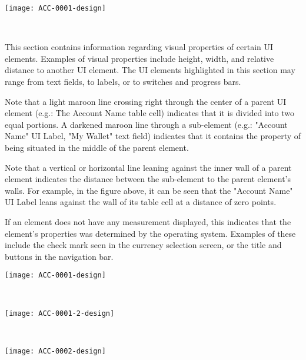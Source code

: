 
\centerline{\texttt{[image: ACC-0001-design]}}

~ \newline

This section contains information regarding visual properties of certain UI elements. Examples of visual properties include height, width, and relative distance to another UI element. The UI elements highlighted in this section may range from text fields, to labels, or to switches and progress bars. \newline

Note that a light maroon line crossing right through the center of a parent UI element (e.g.: The Account Name table cell) indicates that it is divided into two equal portions. A darkened maroon line through a sub-element (e.g.: "Account Name" UI Label, "My Wallet" text field) indicates that it contains the property of being situated in the middle of the parent element. \newline

Note that a vertical or horizontal line leaning against the inner wall of a parent element indicates the distance between the sub-element to the parent element's walls. For example, in the figure above, it can be seen that the "Account Name" UI Label leans against the wall of its table cell at a distance of zero points. \newline

If an element does not have any measurement displayed, this indicates that the element's properties was determined by the operating system. Examples of these include the check mark seen in the currency selection screen, or the title and buttons in the navigation bar.

\centerline{\texttt{[image: ACC-0001-design]}}
~ \newline

\centerline{\texttt{[image: ACC-0001-2-design]}}
~ \newline

\centerline{\texttt{[image: ACC-0002-design]}}